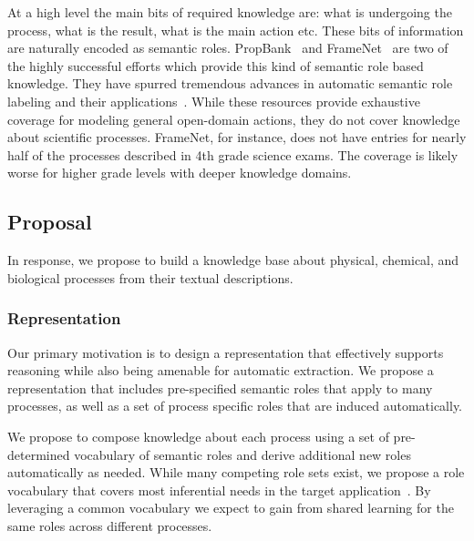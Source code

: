 At a high level the main bits of required knowledge are: what is undergoing the process, what is the result, what is the main action etc.
These bits of information are naturally encoded as semantic roles.
PropBank~\cite{} and FrameNet~\cite{} are two of the highly successful efforts which provide this kind of semantic role based knowledge.
They have spurred tremendous advances in automatic semantic role labeling and their applications~\cite{}.
While these resources provide exhaustive coverage for modeling general open-domain actions,
they do not cover knowledge about scientific processes. 
FrameNet, for instance, does not have entries for nearly half of the processes described in 4th grade science exams. 
The coverage is likely worse for higher grade levels with deeper knowledge domains. 

\subsection{Proposal}

In response, we propose to build a knowledge base about physical, chemical, and biological processes from their textual descriptions. 

\subsubsection*{Representation}

Our primary motivation is to design a representation that effectively supports reasoning while also being amenable for automatic extraction.
We propose a representation that includes pre-specified semantic roles that apply to many processes, as well as a set of process specific roles that are induced automatically.

We propose to compose knowledge about each process using a set of pre-determined vocabulary of semantic roles and derive additional new roles automatically as needed.
While many competing role sets exist, we propose a role vocabulary that covers most inferential needs in the target application~\cite{louvan2015:kcap}.
By leveraging a common vocabulary we expect to gain from shared learning for the same roles across different processes.

